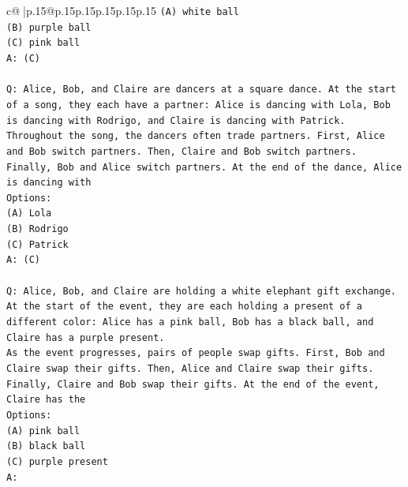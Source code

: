 \documentclass{article}
\begin{document}
{\begin{supertabular}{c@{$\;$}|p{.15\linewidth}@{}p{.15\linewidth}p{.15\linewidth}p{.15\linewidth}p{.15\linewidth}p{.15\linewidth}}
{{{\texttt{(A) white ball} \\
\texttt{(B) purple ball} \\
\texttt{(C) pink ball} \\
\texttt{A: (C)} \\
\\ 
\texttt{Q: Alice, Bob, and Claire are dancers at a square dance. At the start of a song, they each have a partner: Alice is dancing with Lola, Bob is dancing with Rodrigo, and Claire is dancing with Patrick.} \\
\texttt{Throughout the song, the dancers often trade partners. First, Alice and Bob switch partners. Then, Claire and Bob switch partners. Finally, Bob and Alice switch partners. At the end of the dance, Alice is dancing with} \\
\texttt{Options:} \\
\texttt{(A) Lola} \\
\texttt{(B) Rodrigo} \\
\texttt{(C) Patrick} \\
\texttt{A: (C)} \\
\\ 
\texttt{Q: Alice, Bob, and Claire are holding a white elephant gift exchange. At the start of the event, they are each holding a present of a different color: Alice has a pink ball, Bob has a black ball, and Claire has a purple present.} \\
\texttt{As the event progresses, pairs of people swap gifts. First, Bob and Claire swap their gifts. Then, Alice and Claire swap their gifts. Finally, Claire and Bob swap their gifts. At the end of the event, Claire has the} \\
\texttt{Options:} \\
\texttt{(A) pink ball} \\
\texttt{(B) black ball} \\
\texttt{(C) purple present} \\
\texttt{A:} \\
            }
        }
    }
     \\ \\


\end{supertabular}}
\end{document}

